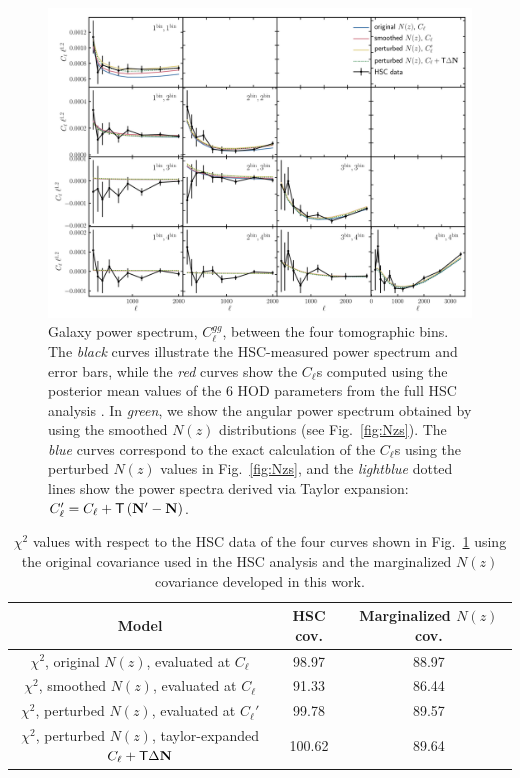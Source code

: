\documentclass[a4paper,11pt]{article}
\newcommand{\vN}{\mathbf{N}}
\begin{document}
\begin{figure}[ht]
\centering  
\includegraphics[width=1.\textwidth]{./Cls}
\caption{Galaxy power spectrum, $C_\ell^{gg}$, between the four
tomographic bins. The \textit{black} curves illustrate the HSC-measured
power spectrum and error bars, while the
\textit{red} curves show the $C_\ell$s
computed using the posterior mean values
of the 6 HOD parameters from the
full HSC analysis \cite{1912.08209}. In 
\textit{green}, we show the angular power
spectrum obtained by using the smoothed
$N(z)$ distributions (see Fig.~\ref{fig:Nzs}). The \textit{blue}
curves correspond to the exact
calculation of the $C_\ell$s using the
perturbed $N(z)$ values in
Fig.~\ref{fig:Nzs}, and the 
\textit{lightblue} dotted lines
show the power spectra derived via
Taylor expansion: $C_\ell' = C_\ell +
 {\sf T} \left(\vN' - {\vN} \right)$.}
\label{fig:Cls}
\end{figure}

\begin{table}
\begin{center}
 \begin{tabular}{c | c c } 
 \hline\hline
 Model & HSC cov. & Marginalized $N(z)$ cov. \\ [0.5ex] 
 \hline
  $\chi^2$, original $N(z)$, evaluated at $C_\ell$ & 98.97 & 88.97 \\ 

 $\chi^2$, smoothed $N(z)$, evaluated at $C_\ell$ & 91.33 & 86.44 \\

 $\chi^2$, perturbed $N(z)$, evaluated at $C_\ell'$ & 99.78 & 89.57 \\

 $\chi^2$, perturbed $N(z)$, taylor-expanded $C_\ell +
 {\sf T} \Delta \vN$ & 100.62 & 89.64 \\
 
 \hline
 \hline
\end{tabular}
\end{center}
\caption{$\chi^2$ values with respect to the HSC data of the 
four curves shown in Fig.~\ref{fig:Cls} using the original 
covariance used in the HSC analysis and the marginalized
$N(z)$ covariance developed in this work.}
\label{tab:lin}
\end{table}
\end{document}
